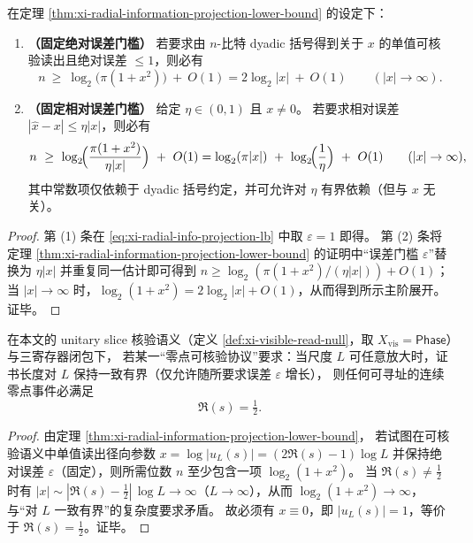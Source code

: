 \begin{corollary}[端点紧化读出的误差门槛位预算（绝对/相对）]\label{cor:xi-radial-info-projection-thresholds}
在定理 \ref{thm:xi-radial-information-projection-lower-bound} 的设定下：
\begin{enumerate}
  \item \textbf{（固定绝对误差门槛）}
  若要求由 \(n\)-比特 dyadic 括号得到关于 \(x\) 的单值可核验读出且绝对误差 \(\le 1\)，则必有
  \[
  n\ \ge\ \log_2\!\bigl(\pi(1+x^2)\bigr)\ +\ O(1)
  =2\log_2|x|\ +\ O(1)\qquad(|x|\to\infty).
  \]
  \item \textbf{（固定相对误差门槛）}
  给定 \(\eta\in(0,1)\) 且 \(x\neq 0\)。
  若要求相对误差 \(|\widehat x-x|\le \eta|x|\)，则必有
  \[
  n\ \ge\ \log_2\!\Bigl(\frac{\pi(1+x^2)}{\eta|x|}\Bigr)\ +\ O(1)
  =\log_2(\pi|x|)\ +\ \log_2\!\Bigl(\frac{1}{\eta}\Bigr)\ +\ O(1)\qquad(|x|\to\infty),
  \]
  其中常数项仅依赖于 dyadic 括号约定，并可允许对 \(\eta\) 有界依赖（但与 \(x\) 无关）。
\end{enumerate}
\end{corollary}

\begin{proof}
第 (1) 条在 \eqref{eq:xi-radial-info-projection-lb} 中取 \(\varepsilon=1\) 即得。
第 (2) 条将定理 \ref{thm:xi-radial-information-projection-lower-bound} 的证明中“误差门槛 \(\varepsilon\)”替换为 \(\eta|x|\) 并重复同一估计即可得到
\(
n\ge \log_2(\pi(1+x^2)/(\eta|x|))+O(1)
\)；
当 \(|x|\to\infty\) 时，\(\log_2(1+x^2)=2\log_2|x|+O(1)\)，从而得到所示主阶展开。证毕。
\end{proof}

\begin{corollary}[规模一致性刚性：\texorpdfstring{$\Re(s)=\tfrac12$}{Re(s)=1/2} 为唯一低复杂度切片]\label{cor:xi-critical-line-unique-low-complexity-slice}
在本文的 unitary slice 核验语义（定义 \ref{def:xi-visible-read-null}，取 \(X_{\mathrm{vis}}=\mathsf{Phase}\)）与三寄存器闭包下，
若某一“零点可核验协议”要求：当尺度 \(L\) 可任意放大时，证书长度对 \(L\) 保持一致有界（仅允许随所要求误差 \(\varepsilon\) 增长），
则任何可寻址的连续零点事件必满足
\[
\Re(s)=\tfrac12.
\]
\end{corollary}

\begin{proof}
由定理 \ref{thm:xi-radial-information-projection-lower-bound}，
若试图在可核验语义中单值读出径向参数 \(x=\log|u_L(s)|=(2\Re(s)-1)\log L\) 并保持绝对误差 \(\varepsilon\)（固定），则所需位数 \(n\) 至少包含一项 \(\log_2(1+x^2)\)。
当 \(\Re(s)\neq\tfrac12\) 时有 \(|x|\sim |\Re(s)-\tfrac12|\,\log L\to\infty\)（\(L\to\infty\)），从而 \(\log_2(1+x^2)\to\infty\)，与“对 \(L\) 一致有界”的复杂度要求矛盾。
故必须有 \(x\equiv 0\)，即 \(|u_L(s)|=1\)，等价于 \(\Re(s)=\tfrac12\)。证毕。
\end{proof}


\endinput
